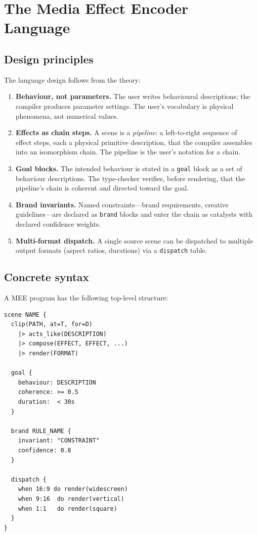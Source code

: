 \documentclass[twocolumn,11pt,a4paper]{article}
\theoremstyle{mee}
\theoremstyle{definition}
\theoremstyle{remark}
\begin{document}
\section{The Media Effect Encoder Language}
\label{sec:language}

\subsection{Design principles}

The language design follows from the theory:

\begin{enumerate}[leftmargin=1.4em,itemsep=2pt]
\item \textbf{Behaviour, not parameters.} The user writes behavioural
  descriptions; the compiler produces parameter settings. The user's
  vocabulary is physical phenomena, not numerical values.
\item \textbf{Effects as chain steps.} A scene is a \emph{pipeline}: a
  left-to-right sequence of effect steps, each a physical primitive
  description, that the compiler assembles into an isomorphism chain. The
  pipeline is the user's notation for a chain.
\item \textbf{Goal blocks.} The intended behaviour is stated in a
  \texttt{goal} block as a set of behaviour descriptions. The type-checker
  verifies, before rendering, that the pipeline's chain is coherent and
  directed toward the goal.
\item \textbf{Brand invariants.} Named constraints---brand requirements,
  creative guidelines---are declared as \texttt{brand} blocks and enter
  the chain as catalysts with declared confidence weights.
\item \textbf{Multi-format dispatch.} A single source scene can be
  dispatched to multiple output formats (aspect ratios, durations) via a
  \texttt{dispatch} table.
\end{enumerate}

\subsection{Concrete syntax}

A MEE program has the following top-level structure:

\begin{lstlisting}[caption={MEE program structure},label={lst:structure}]
scene NAME {
  clip(PATH, at=T, for=D)
    |> acts_like(DESCRIPTION)
    |> compose(EFFECT, EFFECT, ...)
    |> render(FORMAT)

  goal {
    behaviour: DESCRIPTION
    coherence: >= 0.5
    duration:  < 30s
  }

  brand RULE_NAME {
    invariant: "CONSTRAINT"
    confidence: 0.8
  }

  dispatch {
    when 16:9 do render(widescreen)
    when 9:16  do render(vertical)
    when 1:1   do render(square)
  }
}
\end{lstlisting}
\end{document}
